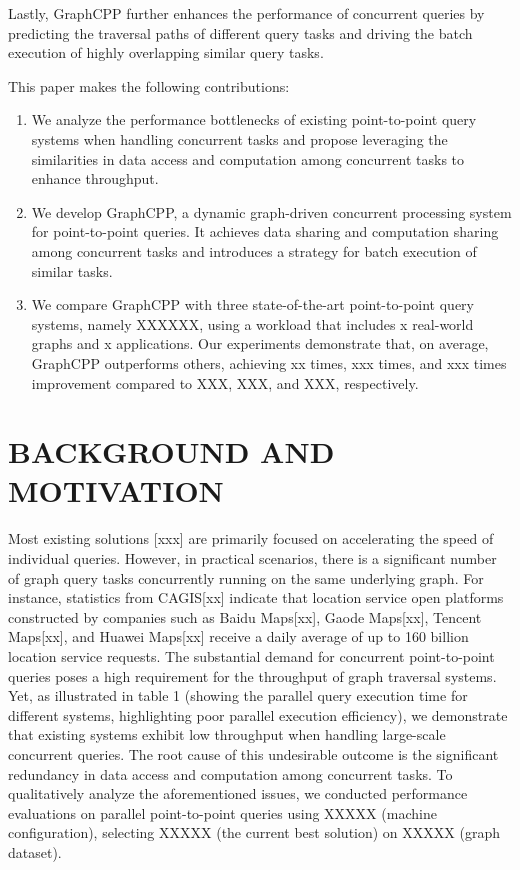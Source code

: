 \documentclass[lettersize,journal]{IEEEtran} %
\begin{document}
Lastly, GraphCPP further enhances the performance of concurrent queries by predicting the traversal paths of different query tasks and driving the batch execution of highly overlapping similar query tasks.

This paper makes the following contributions:
\begin{enumerate}
  \item{We analyze the performance bottlenecks of existing point-to-point query systems when handling concurrent tasks and propose leveraging the similarities in data access and computation among concurrent tasks to enhance throughput.}
  \item{We develop GraphCPP, a dynamic graph-driven concurrent processing system for point-to-point queries. It achieves data sharing and computation sharing among concurrent tasks and introduces a strategy for batch execution of similar tasks.}
  \item{We compare GraphCPP with three state-of-the-art point-to-point query systems, namely XXXXXX, using a workload that includes x real-world graphs and x applications. Our experiments demonstrate that, on average, GraphCPP outperforms others, achieving xx times, xxx times, and xxx times improvement compared to XXX, XXX, and XXX, respectively.}
\end{enumerate}

\section{BACKGROUND AND MOTIVATION}
Most existing solutions [xxx] are primarily focused on accelerating the speed of individual queries. However, in practical scenarios, there is a significant number of graph query tasks concurrently running on the same underlying graph. For instance, statistics from CAGIS[xx] indicate that location service open platforms constructed by companies such as Baidu Maps[xx], Gaode Maps[xx], Tencent Maps[xx], and Huawei Maps[xx] receive a daily average of up to 160 billion location service requests. The substantial demand for concurrent point-to-point queries poses a high requirement for the throughput of graph traversal systems. Yet, as illustrated in table 1 (showing the parallel query execution time for different systems, highlighting poor parallel execution efficiency), we demonstrate that existing systems exhibit low throughput when handling large-scale concurrent queries. The root cause of this undesirable outcome is the significant redundancy in data access and computation among concurrent tasks. To qualitatively analyze the aforementioned issues, we conducted performance evaluations on parallel point-to-point queries using XXXXX (machine configuration), selecting XXXXX (the current best solution) on XXXXX (graph dataset).
\end{document}
